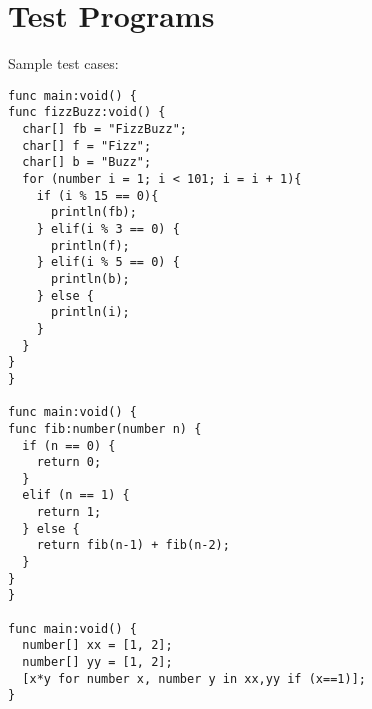 \section{Test Programs}
Sample test cases:
\begin{verbatim}
func main:void() {
func fizzBuzz:void() {
  char[] fb = "FizzBuzz";
  char[] f = "Fizz";
  char[] b = "Buzz";
  for (number i = 1; i < 101; i = i + 1){
    if (i % 15 == 0){
      println(fb);
    } elif(i % 3 == 0) {
      println(f);
    } elif(i % 5 == 0) {
      println(b);
    } else {
      println(i);
    }
  }
}
}

func main:void() {
func fib:number(number n) {
  if (n == 0) {
    return 0;
  }
  elif (n == 1) {
    return 1;
  } else {
    return fib(n-1) + fib(n-2);
  } 
}
}

func main:void() {
  number[] xx = [1, 2];
  number[] yy = [1, 2];
  [x*y for number x, number y in xx,yy if (x==1)];
}

\end{verbatim}
